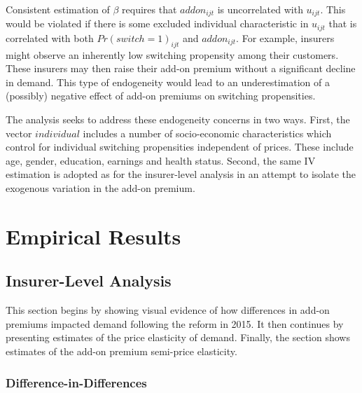 \documentclass[a4paper, 11pt, english]{article}
\begin{document}
Consistent estimation of $\beta$ requires that $addon_{ijt}$ is uncorrelated with $u_{ijt}$. This would be violated if there is some excluded individual characteristic in $u_{ijt}$ that is correlated with both $Pr(switch=1)_{ijt}$ and $addon_{ijt}$. For example, insurers might observe an inherently low switching propensity among their customers. These insurers may then raise their add-on premium without a significant decline in demand. This type of endogeneity would lead to an underestimation of a (possibly) negative effect of add-on premiums on switching propensities. 

The analysis seeks to address these endogeneity concerns in two ways. First, the vector $individual$ includes a number of socio-economic characteristics which control for individual switching propensities independent of prices. These include age, gender, education, earnings and health status. Second, the same IV estimation is adopted as for the insurer-level analysis in an attempt to isolate the exogenous variation in the add-on premium.


\section{Empirical Results \label{sec:empirics}}


\subsection{Insurer-Level Analysis \label{sec:aggregate_analysis}}

This section begins by showing visual evidence of how differences in add-on premiums impacted demand following the reform in 2015. It then continues by presenting estimates of the price elasticity of demand. Finally, the section shows estimates of the add-on premium semi-price elasticity.

\subsubsection*{Difference-in-Differences} 
\end{document}
